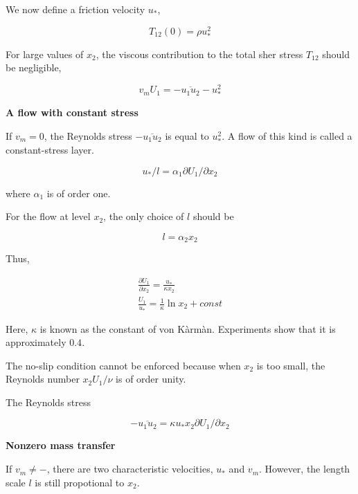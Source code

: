 \documentclass{article}
\begin{document}
We now define a friction velocity $u_*$,

\begin{equation*}
    T_{12}(0)=\rho u_*^2
\end{equation*}

For large values of $x_2$, the viscous contribution to the total sher stress $T_{12}$ should be negligible,

\begin{equation*}
    v_m U_1=-\overline{u_1 u_2}-u_*^2
\end{equation*}

\textbf{A flow with constant stress}

If $v_m=0$, the Reynolds stress $-\overline{u_1 u_2}$ is equal to  $u_*^2$. A flow of this kind is called a constant-stress layer.

\begin{equation*}
    u_*/l=\alpha_1\partial U_1/\partial x_2
\end{equation*}

where $\alpha_1$ is of order one.

For the flow at level $x_2$, the only choice of $l$ should be

\begin{equation*}
    l=\alpha_2 x_2
\end{equation*}

Thus,

\begin{gather*}
    \frac{\partial U_1}{\partial x_2}=\frac{u_*}{\kappa x_2}\\
    \frac{U_1}{u_*}=\frac{1}{\kappa}\ln x_2+const
\end{gather*}

Here, $\kappa$ is known as the constant of von K\`{a}rm\`{a}n. Experiments show that it is approximately $0.4$.

The no-slip condition cannot be enforced because when $x_2$ is too small, the Reynolds number $x_2U_1/\nu$ is of order unity.

The Reynolds stress

\begin{equation*}
    -\overline{u_1 u_2}=\kappa u_*x_2\partial U_1/\partial x_2
\end{equation*}

\textbf{Nonzero mass transfer}

If $v_m\neq-$, there are two characteristic velocities, $u_*$ and $v_m$. However, the length scale $l$ is still propotional to $x_2$.
\end{document}
